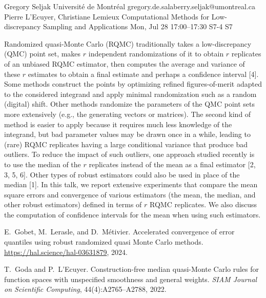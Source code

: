 \begin{talk}
  {Gregory Seljak}%
  {Universit\'e de Montr\'eal}%
  {gregory.de.salaberry.seljak@umontreal.ca}%
  {Pierre L'Ecuyer, Christiane Lemieux}%
  {Computational Methods for Low-discrepancy Sampling and Applications}%
  {}%
  {Mon, Jul 28 17:00–17:30}%
  {S7-4}%
  {S7}%

\medskip

Randomized quasi-Monte Carlo (RQMC) traditionally takes a low-discrepancy (QMC) point set,
makes $r$ independent randomizations of it to obtain $r$ replicates of an unbiased RQMC estimator, 
then computes the average and variance of these $r$ estimates to obtain a final estimate 
and perhaps a confidence interval [4]. 
Some methods construct the points by optimizing refined figures-of-merit adapted to the considered integrand
and apply minimal randomization such as a random (digital) shift.  Other methods randomize
the parameters of the QMC point sets more extensively (e.g., the generating vectors or matrices).
The second kind of method is easier to apply because it requires much less knowledge of the integrand,
but bad parameter values may be drawn once in a while, leading to (rare) RQMC replicates having 
a large conditional variance that produce bad outliers.
To reduce the impact of such outliers, one approach studied recently is to use the median 
of the $r$ replicates instead of the mean as a final estimator [2, 3, 5, 6].
Other types of robust estimators could also be used in place of the median [1].
In this talk, we report extensive experiments that compare the mean square errors 
and convergence of various estimators (the mean, the median, and other robust estimators) 
defined in terms of $r$ RQMC replicates.
We also discuss the computation of confidence intervals for the mean when using such estimators.

{
%
\item
E.~Gobet, M.~Lerasle, and D.~M{\'e}tivier.
Accelerated convergence of error quantiles using robust randomized
  quasi {Monte Carlo} methods.
\url{https://hal.science/hal-03631879}, 2024.

\item
T.~Goda and P.~L'Ecuyer.
Construction-free median quasi-{Monte Carlo} rules for function
  spaces with unspecified smoothness and general weights.
{\em {SIAM} Journal on Scientific Computing}, 44(4):A2765--A2788, 2022.

}
\end{talk}
